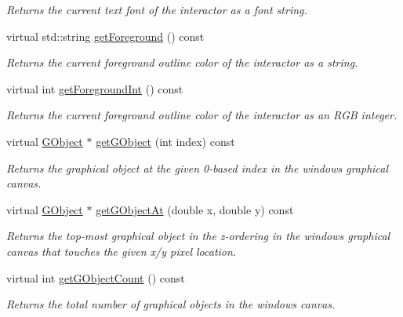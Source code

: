 \begin{DoxyCompactItemize}
\begin{DoxyCompactList}\small\item\em Returns the current text font of the interactor as a font string. \end{DoxyCompactList}\item 
virtual std\+::string \mbox{\hyperlink{classGDrawingSurface_a4fa2d8b0192a3a5b4af4bbfe71194d03}{get\+Foreground}} () const
\begin{DoxyCompactList}\small\item\em Returns the current foreground outline color of the interactor as a string. \end{DoxyCompactList}\item 
virtual int \mbox{\hyperlink{classGDrawingSurface_ac3b12ab385a6ef9ae90fc879860ba726}{get\+Foreground\+Int}} () const
\begin{DoxyCompactList}\small\item\em Returns the current foreground outline color of the interactor as an R\+GB integer. \end{DoxyCompactList}\item 
virtual \mbox{\hyperlink{classGObject}{G\+Object}} $\ast$ \mbox{\hyperlink{classGWindow_adf27adaeeb8b551424b2096a20285fde}{get\+G\+Object}} (int index) const
\begin{DoxyCompactList}\small\item\em Returns the graphical object at the given 0-\/based index in the window\textquotesingle{}s graphical canvas. \end{DoxyCompactList}\item 
virtual \mbox{\hyperlink{classGObject}{G\+Object}} $\ast$ \mbox{\hyperlink{classGWindow_ab174a229ac7a3e9a4cd135d68dcf0076}{get\+G\+Object\+At}} (double x, double y) const
\begin{DoxyCompactList}\small\item\em Returns the top-\/most graphical object in the z-\/ordering in the window\textquotesingle{}s graphical canvas that touches the given x/y pixel location. \end{DoxyCompactList}\item 
virtual int \mbox{\hyperlink{classGWindow_ad59694124f2cdd71af9c137094df4d1f}{get\+G\+Object\+Count}} () const
\begin{DoxyCompactList}\small\item\em Returns the total number of graphical objects in the window\textquotesingle{}s canvas. \end{DoxyCompactList}\item 

\end{DoxyCompactItemize}
